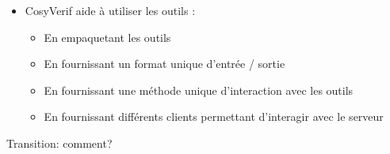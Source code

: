 \documentclass[t, english]{beamer}
\begin{document}
\begin{frame}[c]
{\begin{itemize}
\begin{itemize}
         \item Analyse des résultats pas évidente, par exemple vérifier la
           présence de deadlock avec Prod ne répond pas juste oui/non
       \end{itemize}
     \item CosyVerif aide à utiliser les outils :
       \begin{itemize}
         \item En empaquetant les outils
         \item En fournissant un format unique d'entrée / sortie
         \item En fournissant une méthode unique d'interaction avec les
           outils
         \item En fournissant différents clients permettant d'interagir avec
           le serveur
       \end{itemize}
   \end{itemize}
   Transition: comment?
   }
 \end{frame}
\end{document}
